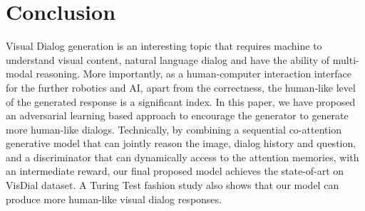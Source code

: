\documentclass[10pt,twocolumn,letterpaper]{article}
\begin{document}
 
\section{Conclusion}

Visual Dialog generation is an interesting topic that requires machine to understand visual content, natural language dialog and have the ability of multi-modal reasoning. More importantly, as a human-computer interaction interface for the further robotics and AI, apart from the correctness, the human-like level of the generated response is a significant index. In this paper, we have proposed an adversarial learning based approach to encourage the generator to generate more human-like dialogs. Technically, by combining a sequential co-attention generative model that can jointly reason the image, dialog history and question, and a discriminator that can dynamically access to the attention memories, with an intermediate reward, our final proposed model achieves the state-of-art on VisDial dataset. A Turing Test fashion study also shows that our model can produce more human-like visual dialog responses.

{\small


}
\end{document}
